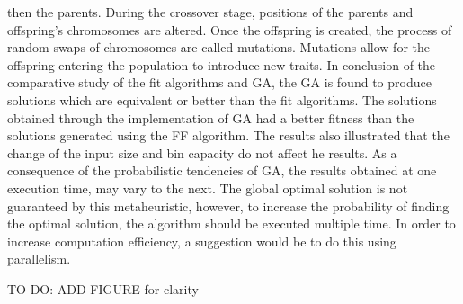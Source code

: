 \begin{flushleft}
then the parents. During the crossover stage, positions of the parents and offspring's chromosomes are altered. Once the offspring is created, the process of random swaps of chromosomes are called mutations. Mutations allow for the offspring entering the population to introduce new traits. In conclusion of the comparative study of the fit algorithms and GA, the GA is found to produce solutions which are equivalent or better than the fit algorithms. The solutions obtained through the implementation of GA had a better fitness than the solutions generated using the FF algorithm. The results also illustrated that the change of the input size and bin capacity do not affect he results. As a consequence of the probabilistic tendencies of GA, the results obtained at one execution time, may vary to the next. The global optimal solution is not guaranteed by this metaheuristic, however, to increase the probability of finding the optimal solution, the algorithm should be executed multiple time. In order to increase computation efficiency, a suggestion would be to do this using parallelism. 
\end{flushleft}

\begin{flushleft}
TO DO: ADD FIGURE for clarity
\end{flushleft}